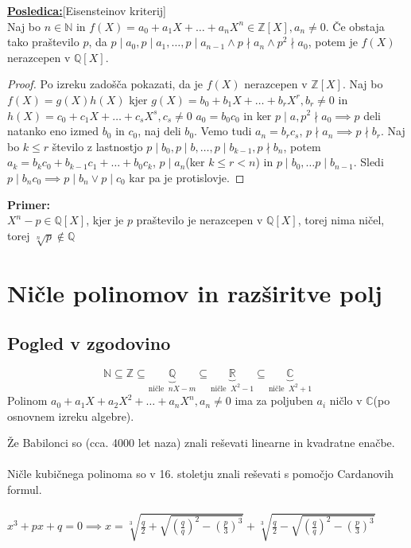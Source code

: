 \documentclass[a4paper]{article}
\newcounter{environment:definition_counter}
\newcounter{environment:theorem_counter}
\newcounter{environment:statement_counter}
\newcounter{example:example_counter}
\newenvironment{example}
{\textbf{Primer:}\\}
{\setcounter{example:example_counter}{0}}
\newenvironment{corollary}
{\underline{\textbf{Posledica:}}}
{}
\begin{document}
\begin{corollary}[Eisensteinov kriterij]\\
Naj bo $n \in \mathbb{N}$ in $f(X) = a_0 + a_1X + \dots + a_nX^n \in \mathbb{Z}[X], a_n \neq 0$. Če obstaja tako praštevilo $p$, da $p \mid a_0, p \mid a_1, \dots, p \mid a_{n-1} \land p \nmid a_n \land p^2 \nmid a_0$, potem je $f(X)$ nerazcepen v $\mathbb{Q}[X]$.
\end{corollary}

\begin{proof}
Po izreku zadošča pokazati, da je $f(X)$ nerazcepen v $\mathbb{Z}[X]$.
Naj bo $f(X) = g(X)h(X)$ kjer
$g(X) = b_0 + b_1X + \dots + b_rX^r, b_r \neq 0$ in $h(X) = c_0 + c_1X + \dots + c_sX^s, c_s \neq 0$ $a_0 = b_0c_0$ in ker $p \mid a, p^2 \nmid a_0 \implies p$ deli natanko eno izmed $b_0$ in $c_0$, naj deli $b_0$. 
Vemo tudi $a_n = b_rc_s$, $p \nmid a_n \implies p \nmid b_r$. Naj bo $k \leq r$ število z lastnostjo $p \mid b_0, p\mid b, \dots , p \mid b_{k-1}, p \nmid b_n$, potem $a_k = b_kc_0 + b_{k-1}c_1 + \dots + b_0c_k$, $p\mid a_n$(ker $k \leq r < n$) in $p \mid b_0, \dots p \mid b_{n-1}$. Sledi $p \mid b_n c_0 \implies p \mid b_n \lor p \mid c_0$ kar pa je protislovje.
\end{proof}

\begin{example}
$X^n - p \in \mathbb{Q}[X]$, kjer je $p$ praštevilo je nerazcepen v $\mathbb{Q}[X]$, torej nima ničel, torej $\sqrt[n]{p} \notin \mathbb{Q}$
\end{example}


\section{Ničle polinomov in razširitve polj}
\subsection{Pogled v zgodovino}

$$\mathbb{N} \subseteq \mathbb{Z} \subseteq \underbrace{\mathbb{Q}}_{\text{ničle }\ nX - m} \subseteq \underbrace{\mathbb{R}}_{\text{ničle }\ X^2 - 1} \subseteq \underbrace{\mathbb{C}}_{\text{ničle }\ X^2 + 1}$$
Polinom $a_0 + a_1X + a_2X^2 + \dots + a_n X^n, a_n \neq 0$ ima za poljuben $a_i$ ničlo v $\mathbb{C}$(po osnovnem izreku algebre).

Že Babilonci so (cca. 4000 let naza) znali reševati linearne in kvadratne enačbe.
\\
\\
Ničle kubičnega polinoma so v 16. stoletju znali reševati s pomočjo Cardanovih formul.
\\
\\
$x^3 + px + q = 0 \implies x = \sqrt[3]{\frac{q}{2} + \sqrt{(\frac{q}{q})^2 - (\frac{p}{3})^3}} + \sqrt[3]{\frac{q}{2} - \sqrt{(\frac{q}{q})^2 - (\frac{p}{3})^3}}$ %
\end{document}
